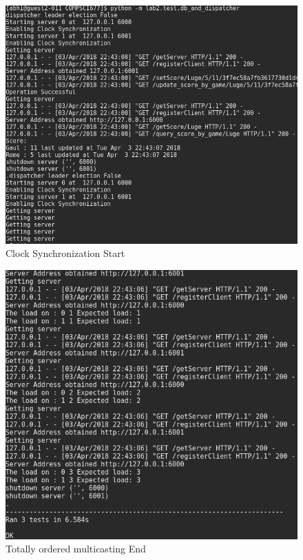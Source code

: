 \documentclass{article}
\begin{document}
\begin{figure}[H]
        \centering
        \includegraphics[width=\textwidth]{outputs/db_and_dispatcher_test_start.png}
        \caption{Clock Synchronization Start \label{fig:clong_synchronization}}
\end{figure}

\begin{figure}[H]
        \centering
        \includegraphics[width=\textwidth]{outputs/db_and_dispatcher_test_end.png}
        \caption{Totally ordered multicasting End \label{fig:clong_synchronization}}
\end{figure}
\end{document}

